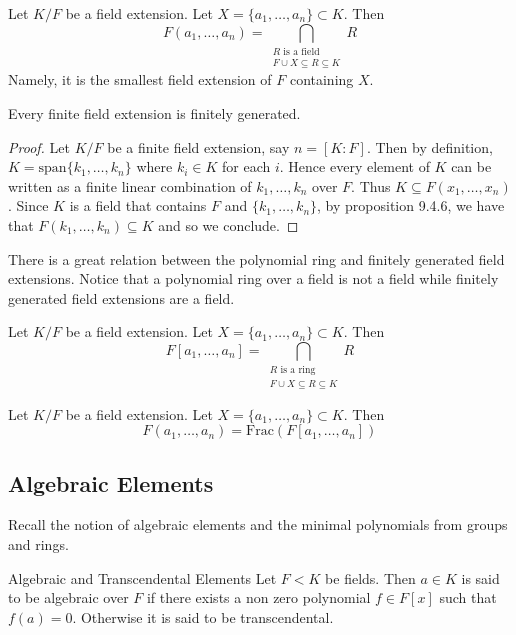 \documentclass[a4paper]{article}
\begin{document}
\begin{prp}{}{} Let $K/F$ be a field extension. Let $X=\{a_1,\dots,a_n\}\subset K$. Then $$F(a_1,\dots,a_n)=\bigcap_{\substack{R\text{ is a field}\\F\cup X\subseteq R\subseteq K}}R$$ Namely, it is the smallest field extension of $F$ containing $X$. 
\end{prp}

\begin{prp}{}{} Every finite field extension is finitely generated. \tcbline
\begin{proof}
Let $K/F$ be a finite field extension, say $n=[K:F]$. Then by definition, $K=\text{span}\{k_1,\dots,k_n\}$ where $k_i\in K$ for each $i$. Hence every element of $K$ can be written as a finite linear combination of $k_1,\dots,k_n$ over $F$. Thus $K\subseteq F(x_1,\dots,x_n)$. Since $K$ is a field that contains $F$ and $\{k_1,\dots,k_n\}$, by proposition 9.4.6, we have that $F(k_1,\dots,k_n)\subseteq K$ and so we conclude. 
\end{proof}
\end{prp}

There is a great relation between the polynomial ring and finitely generated field extensions. Notice that a polynomial ring over a field is not a field while finitely generated field extensions are a field. 

\begin{prp}{}{} Let $K/F$ be a field extension. Let $X=\{a_1,\dots,a_n\}\subset K$. Then $$F[a_1,\dots,a_n]=\bigcap_{\substack{R\text{ is a ring}\\F\cup X\subseteq R\subseteq K}}R$$
\end{prp}

\begin{prp}{}{} Let $K/F$ be a field extension. Let $X=\{a_1,\dots,a_n\}\subset K$. Then $$F(a_1,\dots,a_n)=\text{Frac}\left(F[a_1,\dots,a_n]\right)$$
\end{prp}

\subsection{Algebraic Elements}
Recall the notion of algebraic elements and the minimal polynomials from groups and rings. 

\begin{defn}{Algebraic and Transcendental Elements}{} Let $F<K$ be fields. Then $a\in K$ is said to be algebraic over $F$ if there exists a non zero polynomial $f\in F[x]$ such that $f(a)=0$. Otherwise it is said to be transcendental. 
\end{defn}
\end{document}
